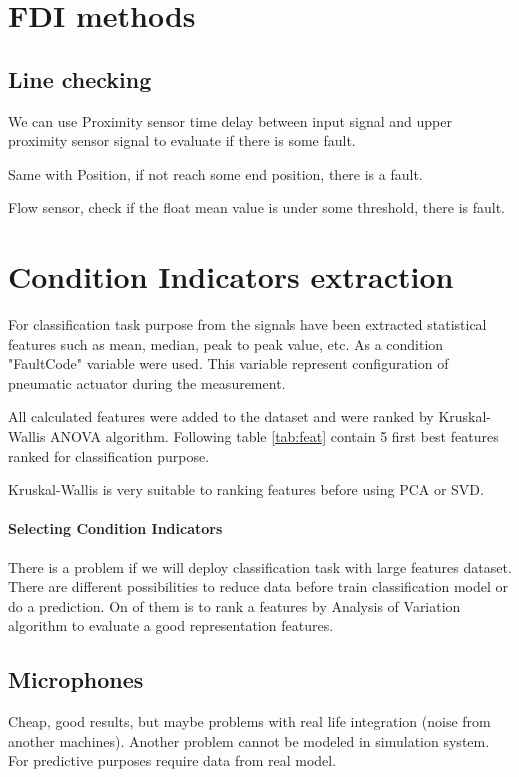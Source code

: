 \section{FDI methods}

\subsection{Line checking}

We can use Proximity sensor time delay between input signal and upper
proximity sensor signal to evaluate if there is some fault.

Same with Position, if not reach some end position, there is a fault.

Flow sensor, check if the float mean value is under some threshold, there
is fault.


\section{Condition Indicators extraction}

For classification task purpose from the signals have been extracted
statistical features such as mean, median, peak to peak value, etc.
As a condition "FaultCode" variable
were used. This variable represent configuration of pneumatic actuator
during the measurement.

All calculated features were added to the dataset and were ranked by
Kruskal-Wallis ANOVA algorithm. Following table \ref{tab:feat} contain
5 first best features ranked for classification purpose.

Kruskal-Wallis is very suitable to ranking features before using PCA or
SVD.

\paragraph{Selecting Condition Indicators} There is a problem if we will
deploy classification task with large features dataset.
There are different possibilities to reduce data before train
classification model or do a prediction. On of them is to rank a features
by Analysis of Variation algorithm to evaluate a good representation
features.




\subsection{Microphones}
Cheap, good results, but maybe problems with real life integration (noise
from another machines). Another problem cannot be modeled in simulation
system. For predictive purposes require data from real model.

